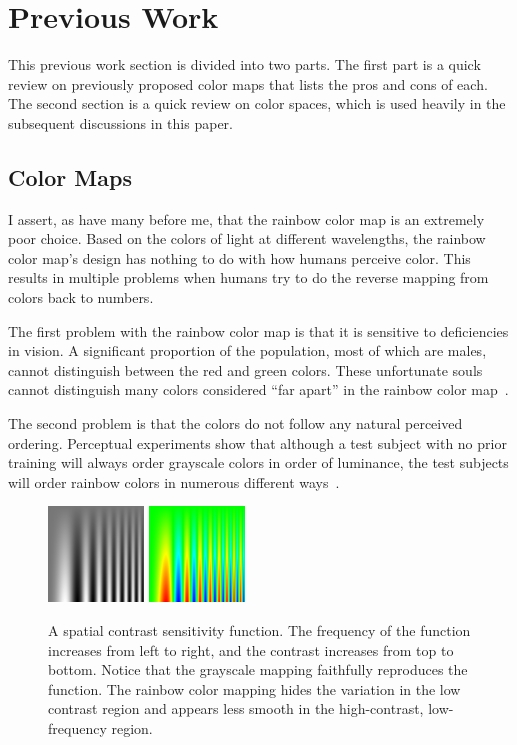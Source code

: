 \documentclass[twocolumn]{article}
\newcommand{\lcite}[1]{~\cite{#1}}
\begin{document}
\section{Previous Work}
\label{sec:PreviousWork}

This previous work section is divided into two parts.  The first part is a
quick review on previously proposed color maps that lists the pros and
cons of each.  The second section is a quick review on color spaces,
which is used heavily in the subsequent discussions in this paper.

\subsection{Color Maps}
\label{sec:PreviousWork:ColorMaps}

I assert, as have many before me, that the rainbow color map is an
extremely poor choice.  Based on the colors of light at different
wavelengths, the rainbow color map's design has nothing to do with how
humans perceive color.  This results in multiple problems when humans try
to do the reverse mapping from colors back to numbers.

The first problem with the rainbow color map is that it is sensitive to
deficiencies in vision.  A significant proportion of the population, most
of which are males, cannot distinguish between the red and green colors.
These unfortunate souls cannot distinguish many colors considered ``far
apart'' in the rainbow color map\lcite{Light04}.

The second problem is that the colors do not follow any natural perceived
ordering.  Perceptual experiments show that although a test subject with
no prior training will always order grayscale colors in order of luminance,
the test subjects will order rainbow colors in numerous different
ways\lcite{Ware04}.

\begin{figure}
  \centering
  \includegraphics[width=1.0in]{images/GrayscaleSpatialContrast}
  \qquad
  \includegraphics[width=1.0in]{images/RainbowSpatialContrast}
  \caption{A spatial contrast sensitivity function.  The frequency of the
    function increases from left to right, and the contrast increases from
    top to bottom.  Notice that the grayscale mapping faithfully reproduces
    the function.  The rainbow color mapping hides the variation in the low
    contrast region and appears less smooth in the high-contrast,
    low-frequency region.}
  \label{fig:RainbowSpatialContrast}
\end{figure}
\end{document}
